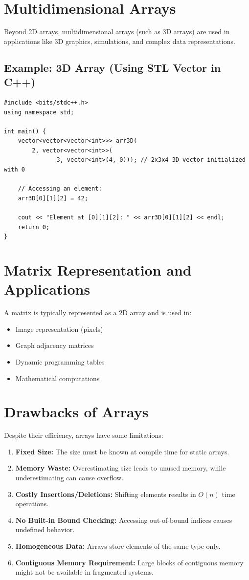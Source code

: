 \section{Multidimensional Arrays}
Beyond 2D arrays, multidimensional arrays (such as 3D arrays) are used in applications like 3D graphics, simulations, and complex data representations.

\subsection*{Example: 3D Array (Using STL Vector in C++)}
\begin{lstlisting}[style=cppstyle, caption=3D Array Declaration using STL Vector]
#include <bits/stdc++.h>
using namespace std;

int main() {
    vector<vector<vector<int>>> arr3D(
        2, vector<vector<int>>(
               3, vector<int>(4, 0))); // 2x3x4 3D vector initialized with 0
    
    // Accessing an element:
    arr3D[0][1][2] = 42;
    
    cout << "Element at [0][1][2]: " << arr3D[0][1][2] << endl;
    return 0;
}
\end{lstlisting}

\section{Matrix Representation and Applications}
A matrix is typically represented as a 2D array and is used in:
\begin{itemize}
  \item Image representation (pixels)
  \item Graph adjacency matrices
  \item Dynamic programming tables
  \item Mathematical computations
\end{itemize}

\section{Drawbacks of Arrays}
Despite their efficiency, arrays have some limitations:
\begin{enumerate}
  \item \textbf{Fixed Size:} The size must be known at compile time for static arrays.
  \item \textbf{Memory Waste:} Overestimating size leads to unused memory, while underestimating can cause overflow.
  \item \textbf{Costly Insertions/Deletions:} Shifting elements results in \(O(n)\) time operations.
  \item \textbf{No Built-in Bound Checking:} Accessing out-of-bound indices causes undefined behavior.
  \item \textbf{Homogeneous Data:} Arrays store elements of the same type only.
  \item \textbf{Contiguous Memory Requirement:} Large blocks of contiguous memory might not be available in fragmented systems.
\end{enumerate}

